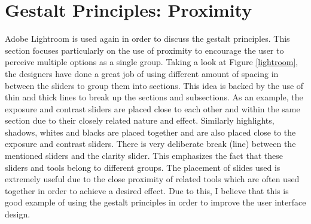 \documentclass[12pt]{article}
\begin{document}
\section{Gestalt Principles: Proximity}
Adobe Lightroom is used again in order to discuss the gestalt principles. This section focuses particularly on the use of proximity to encourage the user to perceive multiple options as a single group. Taking a look at Figure \ref{lightroom}, the designers have done a great job of using different amount of spacing in between the sliders to group them into sections. This idea is backed by the use of thin and thick lines to break up the sections and subsections. As an example, the exposure and contrast sliders are placed close to each other and within the same section due to their closely related nature and effect. Similarly highlights, shadows, whites and blacks are placed together and are also placed close to the exposure and contrast sliders. There is very deliberate break (line) between the mentioned sliders and the clarity slider. This emphasizes the fact that these sliders and tools belong to different groups. The placement of slides used is extremely useful due to the close proximity of related tools which are often used together in order to achieve a desired effect. Due to this, I believe that this is good example of using the gestalt principles in order to improve the user interface design.
	
	
\end{document}
